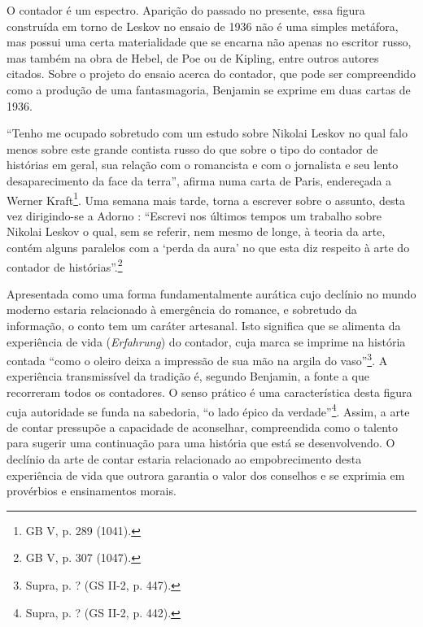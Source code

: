O contador é um espectro. Aparição do passado no presente, essa figura
construída em torno de Leskov no ensaio de 1936 não é uma simples
metáfora, mas possui uma certa materialidade que se encarna não apenas
no escritor russo, mas também na obra de Hebel, de Poe ou de Kipling,
entre outros autores citados. Sobre o projeto do ensaio acerca do
contador, que pode ser compreendido como a produção de uma
fantasmagoria, Benjamin se exprime em duas cartas de 1936.

``Tenho me ocupado sobretudo com um estudo sobre Nikolai Leskov no qual
falo menos sobre este grande contista russo do que sobre o tipo do
contador de histórias em geral, sua relação com o romancista e com o
jornalista e seu lento desaparecimento da face da terra'', afirma numa
carta de Paris, endereçada a Werner Kraft\footnote{GB V, p. 289 (1041).}.
Uma semana mais tarde, torna a escrever sobre o assunto, desta vez
dirigindo-se a Adorno : ``Escrevi nos últimos tempos um trabalho sobre
Nikolai Leskov o qual, sem se referir, nem mesmo de longe, à teoria da
arte, contém alguns paralelos com a `perda da aura' no que esta diz
respeito à arte do contador de histórias''.\footnote{GB V, p. 307
  (1047).}

Apresentada como uma forma fundamentalmente aurática cujo declínio no
mundo moderno estaria relacionado à emergência do romance, e sobretudo
da informação, o conto tem um caráter artesanal. Isto significa que se
alimenta da experiência de vida (\emph{Erfahrung}) do contador, cuja
marca se imprime na história contada ``como o oleiro deixa a impressão
de sua mão na argila do vaso''\footnote{Supra, p. ? (GS II-2, p. 447).}.
A experiência transmissível da tradição é, segundo Benjamin, a fonte a
que recorreram todos os contadores. O senso prático é uma característica
desta figura cuja autoridade se funda na sabedoria, ``o lado épico da
verdade''\footnote{Supra, p. ? (GS II-2, p. 442).}. Assim, a arte de
contar pressupõe a capacidade de aconselhar, compreendida como o talento
para sugerir uma continuação para uma história que está se
desenvolvendo. O declínio da arte de contar estaria relacionado ao
empobrecimento desta experiência de vida que outrora garantia o valor
dos conselhos e se exprimia em provérbios e ensinamentos morais.

